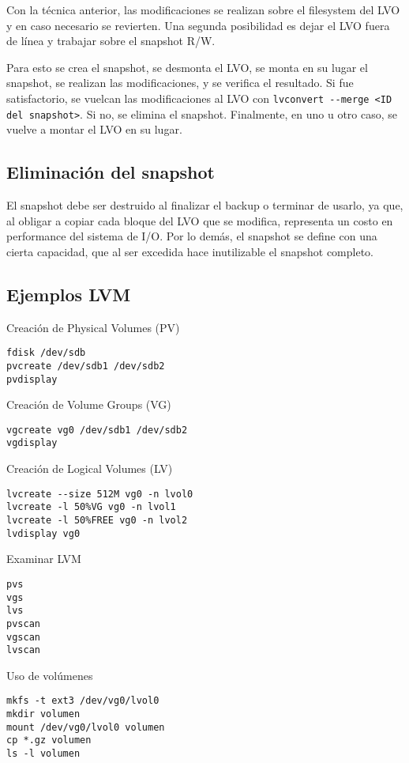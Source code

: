 Con la técnica anterior, las modificaciones se realizan sobre el filesystem del LVO y en caso necesario se revierten. Una segunda posibilidad es dejar el LVO fuera de línea y trabajar sobre el snapshot R/W. 

Para esto se crea el snapshot, se desmonta el LVO, se monta en su lugar el snapshot, se realizan las modificaciones, y se verifica el resultado. Si fue satisfactorio, se vuelcan las modificaciones al LVO con  \lstinline$lvconvert --merge <ID del snapshot>$. Si no, se elimina el snapshot. Finalmente, en uno u otro caso, se vuelve a montar el LVO en su lugar.

\subsection{Eliminación del snapshot}
\label{ssub:snapdel}

El snapshot debe ser destruido al finalizar el backup o terminar de usarlo, ya que, al obligar a  copiar  cada bloque del LVO que se modifica, representa un  costo en performance del sistema de I/O. Por lo demás, el snapshot se define con una cierta capacidad, que al ser excedida hace inutilizable el snapshot completo.


\subsection{Ejemplos LVM}
\label{sub:ejemplosLVM}

Creación de Physical Volumes (PV)
\begin{lstlisting}
fdisk /dev/sdb
pvcreate /dev/sdb1 /dev/sdb2
pvdisplay
\end{lstlisting}

Creación de Volume Groups (VG)
\begin{lstlisting}
vgcreate vg0 /dev/sdb1 /dev/sdb2
vgdisplay
\end{lstlisting}

Creación de Logical Volumes (LV)
\begin{lstlisting}
lvcreate --size 512M vg0 -n lvol0
lvcreate -l 50%VG vg0 -n lvol1
lvcreate -l 50%FREE vg0 -n lvol2
lvdisplay vg0
\end{lstlisting}

Examinar LVM
\begin{lstlisting}
pvs
vgs
lvs
pvscan
vgscan
lvscan
\end{lstlisting}

Uso de volúmenes
\begin{lstlisting}
mkfs -t ext3 /dev/vg0/lvol0
mkdir volumen
mount /dev/vg0/lvol0 volumen
cp *.gz volumen
ls -l volumen
\end{lstlisting}

